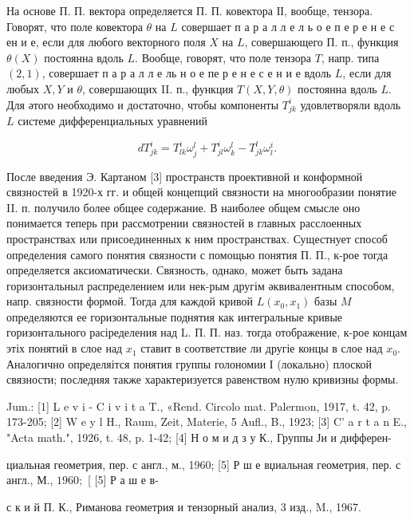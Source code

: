 \documentclass[10pt]{article}
\begin{document}
На основе П. П. вектора определяется П. П. ковектора ІІ, вообще, тензора. Говорят, что поле ковектора $\theta$ на $L$ совершает п а р а л л е л ь о е п е р е н е с ен и е, если для любого векторного поля $X$ на $L$, совершающего П. п., функция $\theta(X)$ постоянна вдоль $L$. Вообще, говорят, что поле тензора $T$, напр. типа $(2,1)$, совершает п а р а л л е ль н о е пе р е н е с е н и е вдоль $L$, если для любых $X, Y$ и $\theta$, совершающих II. п., функция $T(X, Y, \theta)$ постоянна вдоль $L$. Для әтого необходимо и достаточно, чтобы компоненты $T_{j k}^{i}$ удовлетворяли вдоль $L$ системе дифференциальных уравнений



\[

d T_{j k}^{i}=T_{l k}^{i} \omega_{j}^{l}+T_{j l}^{i} \omega_{k}^{l}-T_{j k}^{l} \omega_{l}^{i} .

\]



После введения Э. Картаном [3] пространств проективной и конформной связностей в 1920-х гг. и общей концепций связности на многообразии понятие II. п. получило более общее содержание. В наиболее общем смысле оно понимается теперь при рассмотрении связностей в главных расслоенных пространствах или присоединенных к ним пространствах. Сущестнует способ определения самого понятия связности с помощью понятия П. П., к-рое тогда определяется аксиоматически. Связность, однако, может быть задана горизонтальныл распределением или нек-рым другім әквивалентным способом, напр. связности формой. Тогда для каждой кривой $L\left(x_{0}, x_{1}\right)$ базы $M$ определяются ее горизонтальные поднятия как интегральные кривые горизонтального расіределения над L. П. П. наз. тогда отображение, к-рое концам этіх понятий в слое над $x_{1}$ ставит в соответствие ли другіе концы в слое над $x_{0}$. Аналогично определяітся понятия группы голономии І (локально) плоской связности; последняя также характеризуется равенством нулю кривизны формы.



Jum.: [1] L e v i - C i v i t a T., «Rend. Circolo mat. Palermon, 1917, t. 42, p. 173-205; [2] W e y l H., Raum, Zeit, Materie, 5 Aufl., B., 1923; [3] C' a r t a n E., "Acta math.", 1926, t. 48, p. 1-42; [4] Н о м и д з у К., Группы Ји и дифферен-

циальная геометрия, пер. с англ., м., 1960; [5] Р ш е вџиальная геометрия, пер. с англ., М., $1960 ;$ [ [5] Р а ш е в-

с к и й П. К., Риманова геометрия и тензорный анализ, 3 изд., M., 1967.
\end{document}
